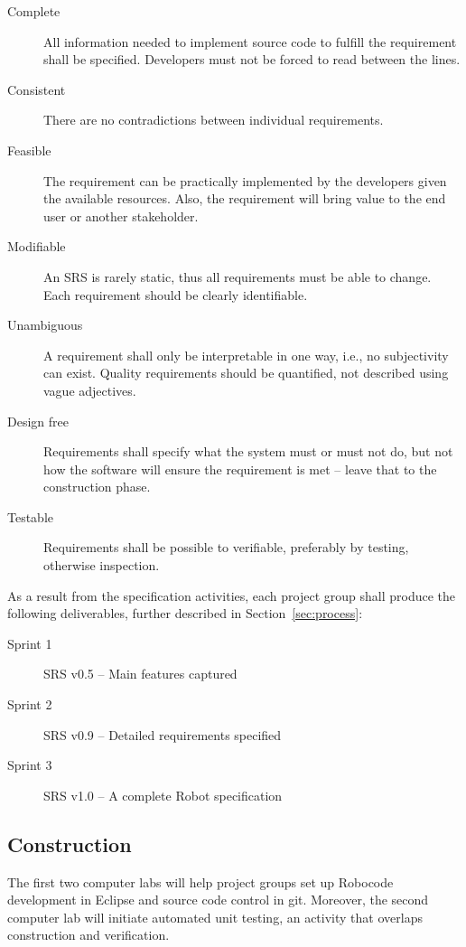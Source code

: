 \documentclass{scrreprt}
\begin{document}
\begin{description}
\item[Complete] All information needed to implement source code to fulfill the requirement shall be specified. Developers must not be forced to read between the lines.
\item[Consistent] There are no contradictions between individual requirements.
\item[Feasible] The requirement can be practically implemented by the developers given the available resources. Also, the requirement will bring value to the end user or another stakeholder.
\item[Modifiable] An SRS is rarely static, thus all requirements must be able to change. Each requirement should be clearly identifiable.
\item[Unambiguous] A requirement shall only be interpretable in one way, i.e., no subjectivity can exist. Quality requirements should be quantified, not described using vague adjectives.
\item[Design free] Requirements shall specify what the system must or must not do, but not how the software will ensure the requirement is met -- leave that to the construction phase.
\item[Testable] Requirements shall be possible to verifiable, preferably by testing, otherwise inspection. 
\end{description}

As a result from the specification activities, each project group shall produce the following deliverables, further described in Section~\ref{sec:process}:
\begin{description}
\item[Sprint 1] SRS v0.5 -- Main features captured
\item[Sprint 2] SRS v0.9 -- Detailed requirements specified
\item[Sprint 3] SRS v1.0 -- A complete Robot specification
\end{description}

\subsection{Construction} \label{sec:constr}
The first two computer labs will help project groups set up Robocode development in Eclipse and source code control in git. Moreover, the second computer lab will initiate automated unit testing, an activity that overlaps construction and verification.
\end{document}
